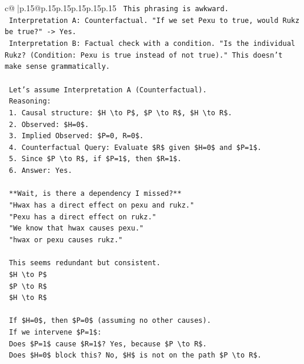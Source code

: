 \documentclass{article}
\begin{document}
{\begin{supertabular}{c@{$\;$}|p{.15\linewidth}@{}p{.15\linewidth}p{.15\linewidth}p{.15\linewidth}p{.15\linewidth}p{.15\linewidth}}
{{{\texttt{    This phrasing is awkward.} \\
\texttt{    Interpretation A: Counterfactual. "If we set Pexu to true, would Rukz be true?" {-}> Yes.} \\
\texttt{    Interpretation B: Factual check with a condition. "Is the individual Rukz? (Condition: Pexu is true instead of not true)." This doesn't make sense grammatically.} \\
\\ 
\texttt{    Let's assume Interpretation A (Counterfactual).} \\
\texttt{    Reasoning:} \\
\texttt{    1. Causal structure: \$H \textbackslash{}to P\$, \$P \textbackslash{}to R\$, \$H \textbackslash{}to R\$.} \\
\texttt{    2. Observed: \$H=0\$.} \\
\texttt{    3. Implied Observed: \$P=0, R=0\$.} \\
\texttt{    4. Counterfactual Query: Evaluate \$R\$ given \$H=0\$ and \$P=1\$.} \\
\texttt{    5. Since \$P \textbackslash{}to R\$, if \$P=1\$, then \$R=1\$.} \\
\texttt{    6. Answer: Yes.} \\
\\ 
\texttt{    **Wait, is there a dependency I missed?**} \\
\texttt{    "Hwax has a direct effect on pexu and rukz."} \\
\texttt{    "Pexu has a direct effect on rukz."} \\
\texttt{    "We know that hwax causes pexu."} \\
\texttt{    "hwax or pexu causes rukz."} \\
\\ 
\texttt{    This seems redundant but consistent.} \\
\texttt{    \$H \textbackslash{}to P\$} \\
\texttt{    \$P \textbackslash{}to R\$} \\
\texttt{    \$H \textbackslash{}to R\$} \\
\\ 
\texttt{    If \$H=0\$, then \$P=0\$ (assuming no other causes).} \\
\texttt{    If we intervene \$P=1\$:} \\
\texttt{    Does \$P=1\$ cause \$R=1\$? Yes, because \$P \textbackslash{}to R\$.} \\
\texttt{    Does \$H=0\$ block this? No, \$H\$ is not on the path \$P \textbackslash{}to R\$.} \\
}}}
\end{supertabular}}
\end{document}
